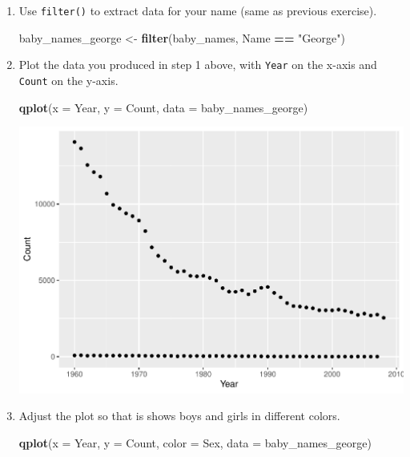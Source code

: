 \documentclass[
]{book}
\newenvironment{Shaded}{\begin{snugshade}}{\end{snugshade}}
\newcommand{\DataTypeTok}[1]{\textcolor[rgb]{0.13,0.29,0.53}{#1}}
\newcommand{\KeywordTok}[1]{\textcolor[rgb]{0.13,0.29,0.53}{\textbf{#1}}}
\newcommand{\NormalTok}[1]{#1}
\newcommand{\OperatorTok}[1]{\textcolor[rgb]{0.81,0.36,0.00}{\textbf{#1}}}
\newcommand{\StringTok}[1]{\textcolor[rgb]{0.31,0.60,0.02}{#1}}
\begin{document}
\begin{enumerate}
\def\labelenumi{\arabic{enumi}.}
\item
  Use \texttt{filter()} to extract data for your name (same as previous exercise).

\begin{Shaded}
\begin{Highlighting}[]
\NormalTok{baby\_names\_george \textless{}{-}}\StringTok{ }\KeywordTok{filter}\NormalTok{(baby\_names, Name }\OperatorTok{==}\StringTok{ "George"}\NormalTok{)}
\end{Highlighting}
\end{Shaded}
\item
  Plot the data you produced in step 1 above, with \texttt{Year} on the x-axis and \texttt{Count} on the y-axis.

\begin{Shaded}
\begin{Highlighting}[]
\KeywordTok{qplot}\NormalTok{(}\DataTypeTok{x =}\NormalTok{ Year, }\DataTypeTok{y =}\NormalTok{ Count, }\DataTypeTok{data =}\NormalTok{ baby\_names\_george)}
\end{Highlighting}
\end{Shaded}

  \includegraphics{R/Rintro/figures/unnamed-chunk-49-1.pdf}
\item
  Adjust the plot so that is shows boys and girls in different colors.

\begin{Shaded}
\begin{Highlighting}[]
\KeywordTok{qplot}\NormalTok{(}\DataTypeTok{x =}\NormalTok{ Year, }\DataTypeTok{y =}\NormalTok{ Count, }\DataTypeTok{color =}\NormalTok{ Sex, }\DataTypeTok{data =}\NormalTok{ baby\_names\_george)}
\end{Highlighting}
\end{Shaded}


\end{enumerate}
\end{document}
